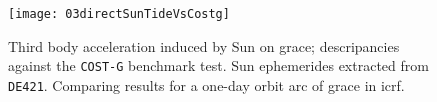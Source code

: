 \begin{figure}
  \centering
  \texttt{[image: 03directSunTideVsCostg]}
  \caption{Third body acceleration induced by Sun on \gls{grace}; descripancies 
   against the \texttt{COST-G} benchmark test. Sun ephemerides extracted from \texttt{DE421}.
   Comparing results for a one-day orbit arc of \gls{grace} in \gls{icrf}.}
  \label{fig:directSunTideIcrfVsCostg}
\end{figure}

